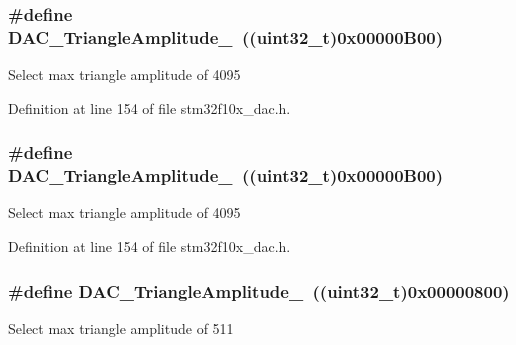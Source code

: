 \subsubsection[{\texorpdfstring{D\+A\+C\+\_\+\+Triangle\+Amplitude\+\_\+4095}{DAC_TriangleAmplitude_4095}}]{\setlength{\rightskip}{0pt plus 5cm}\#define D\+A\+C\+\_\+\+Triangle\+Amplitude\+\_~(({\bf uint32\+\_\+t})0x00000\+B00)}\hypertarget{group___d_a_c__lfsrunmask__triangleamplitude_ga3ce69f5a63a2464dc4b5f73cb6fe72f5}{}\label{group___d_a_c__lfsrunmask__triangleamplitude_ga3ce69f5a63a2464dc4b5f73cb6fe72f5}
Select max triangle amplitude of 4095 

Definition at line 154 of file stm32f10x\+\_\+dac.\+h.

\subsubsection[{\texorpdfstring{D\+A\+C\+\_\+\+Triangle\+Amplitude\+\_\+4095}{DAC_TriangleAmplitude_4095}}]{\setlength{\rightskip}{0pt plus 5cm}\#define D\+A\+C\+\_\+\+Triangle\+Amplitude\+\_~(({\bf uint32\+\_\+t})0x00000\+B00)}\hypertarget{group___d_a_c__lfsrunmask__triangleamplitude_ga3ce69f5a63a2464dc4b5f73cb6fe72f5}{}\label{group___d_a_c__lfsrunmask__triangleamplitude_ga3ce69f5a63a2464dc4b5f73cb6fe72f5}
Select max triangle amplitude of 4095 

Definition at line 154 of file stm32f10x\+\_\+dac.\+h.

\subsubsection[{\texorpdfstring{D\+A\+C\+\_\+\+Triangle\+Amplitude\+\_\+511}{DAC_TriangleAmplitude_511}}]{\setlength{\rightskip}{0pt plus 5cm}\#define D\+A\+C\+\_\+\+Triangle\+Amplitude\+\_~(({\bf uint32\+\_\+t})0x00000800)}\hypertarget{group___d_a_c__lfsrunmask__triangleamplitude_ga565b0c97bbdf152756617d491bf8ef85}{}\label{group___d_a_c__lfsrunmask__triangleamplitude_ga565b0c97bbdf152756617d491bf8ef85}
Select max triangle amplitude of 511 

